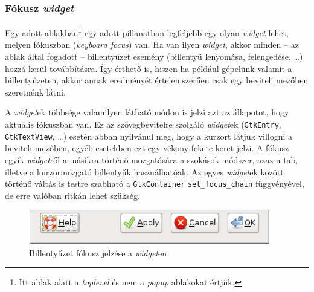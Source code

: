 \subsubsection{Fókusz \textit{widget}}
\label{sec:widgetfocus}

Egy adott ablakban\footnote{Itt ablak alatt a \textit{toplevel} és nem a \textit{popup} ablakokat értjük.} egy adott pillanatban legfeljebb egy olyan \textit{widget} lehet, melyen fókuszban (\textit{keyboard focus}) van. Ha van ilyen \textit{widget}, akkor minden -- az ablak által fogadott -- billentyűzet esemény (billentyű lenyomása, felengedése, \dots) hozzá kerül továbbításra. Így érthető is, hiszen ha például gépelünk valamit a billentyűzeten, akkor annak eredményét értelemszerűen csak egy beviteli mezőben  szeretnénk látni.

A \textit{widget}ek többsége valamilyen látható módon is jelzi azt az állapotot, hogy aktuális fókuszban van. Ez az szövegbevitelre szolgáló \textit{widget}ek (\texttt{GtkEntry}, \texttt{GtkTextView}, \dots) esetén abban nyilvánul meg, hogy a kurzort látjuk villogni a beviteli mezőben, egyéb esetekben ezt egy vékony fekete keret jelzi. A fókusz egyik \textit{widget}ről a másikra történő mozgatására a szokások módszer, azaz a tab, illetve a kurzormozgató billentyűk használhatóak. Az egyes \textit{widget}ek között történő váltás is testre szabható a \texttt{GtkContainer} \texttt{set\_focus\_chain} függvényével, de erre valóban ritkán lehet szükség.

\begin{figure}[H]
\begin{center}
\includegraphics[height=15mm]{images/widget-keyboard-focus.png}
\caption{Billentyűzet fókusz jelzése a \textit{widget}en}
\end{center}
\end{figure}

